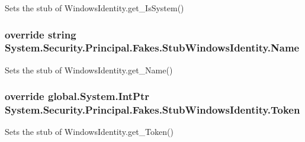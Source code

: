 Sets the stub of Windows\-Identity.\-get\-\_\-\-Is\-System()

\hypertarget{class_system_1_1_security_1_1_principal_1_1_fakes_1_1_stub_windows_identity_acff234b11508228383ac7f05be1b28c7}{
\subsubsection[{Name}]{\setlength{\rightskip}{0pt plus 5cm}override string System.\-Security.\-Principal.\-Fakes.\-Stub\-Windows\-Identity.\-Name\hspace{0.3cm}{\ttfamily [get]}}}\label{class_system_1_1_security_1_1_principal_1_1_fakes_1_1_stub_windows_identity_acff234b11508228383ac7f05be1b28c7}


Sets the stub of Windows\-Identity.\-get\-\_\-\-Name()

\hypertarget{class_system_1_1_security_1_1_principal_1_1_fakes_1_1_stub_windows_identity_a35f5d9777529969af12b3e70ec8e2724}{
\subsubsection[{Token}]{\setlength{\rightskip}{0pt plus 5cm}override global.\-System.\-Int\-Ptr System.\-Security.\-Principal.\-Fakes.\-Stub\-Windows\-Identity.\-Token\hspace{0.3cm}{\ttfamily [get]}}}\label{class_system_1_1_security_1_1_principal_1_1_fakes_1_1_stub_windows_identity_a35f5d9777529969af12b3e70ec8e2724}


Sets the stub of Windows\-Identity.\-get\-\_\-\-Token()

